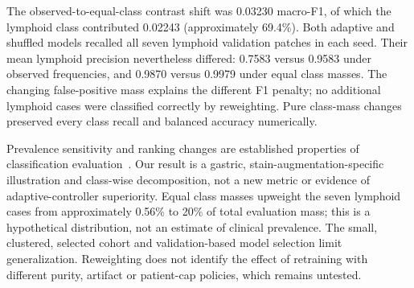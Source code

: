 The observed-to-equal-class contrast shift was 0.03230 macro-F1, of which the
lymphoid class contributed 0.02243 (approximately 69.4\%). Both adaptive and
shuffled models recalled all seven lymphoid validation patches in each seed.
Their mean lymphoid precision nevertheless differed: 0.7583 versus 0.9583
under observed frequencies, and 0.9870 versus 0.9979 under equal class masses.
The changing false-positive mass explains the different F1 penalty; no additional
lymphoid cases were classified correctly by reweighting. Pure class-mass changes
preserved every class recall and balanced accuracy numerically.

Prevalence sensitivity and ranking changes are established properties of
classification evaluation~\cite{brabec2020imbalance,opitz2024metrics}.
Our result is a gastric, stain-augmentation-specific illustration and class-wise
decomposition, not a new metric or evidence of adaptive-controller superiority.
Equal class masses upweight the seven lymphoid cases from approximately 0.56\%
to 20\% of total evaluation mass; this is a hypothetical distribution, not an
estimate of clinical prevalence. The small, clustered, selected cohort and
validation-based model selection limit generalization. Reweighting does not
identify the effect of retraining with different purity, artifact or patient-cap
policies, which remains untested.
